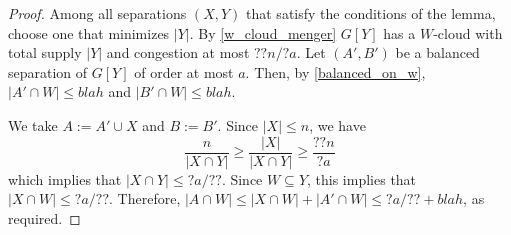\documentclass{patmorin}
\begin{document}
\begin{proof}
  Among all separations $(X,Y)$ that satisfy the conditions of the lemma, choose one that minimizes $|Y|$.  By \cref{w_cloud_menger} $G[Y]$ has a $W$-cloud with total supply $|Y|$ and congestion at most ${??}n/{?a}$.    Let $(A',B')$ be a balanced separation of $G[Y]$ of order at most $a$.  Then, by \cref{balanced_on_w}, $|A'\cap W|\le blah$ and $|B'\cap W|\le blah$.

  We take $A:=A'\cup X$ and $B:=B'$.  Since $|X|\le n$, we have
  \[
     \frac{n}{|X\cap Y|} \ge \frac{|X|}{|X\cap Y|} \ge \frac{{??}n}{{?}a}
  \]
  which implies that $|X\cap Y|\le {?}a/{??}$.  Since $W\subseteq Y$, this implies that $|X\cap W|\le {?}a/{??}$.  Therefore, $|A\cap W|\le |X\cap W|+|A'\cap W| \le {?}a/{??} + blah$, as required.
\end{proof}




\end{document}
